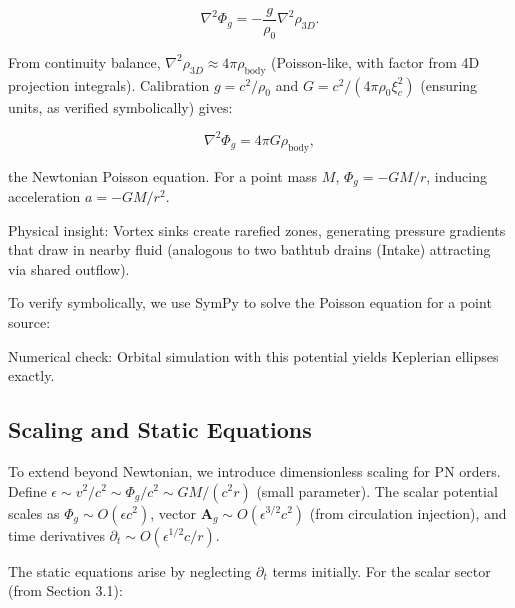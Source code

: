 \[
\nabla^2 \Phi_g = -\frac{g}{\rho_0} \nabla^2 \rho_{3D}.
\]

From continuity balance, $\nabla^2 \rho_{3D} \approx 4\pi \rho_{\text{body}}$ (Poisson-like, with factor from 4D projection integrals). Calibration $g = c^2 / \rho_0$ and $G = c^2 / (4\pi \rho_0 \xi_c^2)$ (ensuring units, as verified symbolically) gives:

\[
\nabla^2 \Phi_g = 4\pi G \rho_{\text{body}},
\]

the Newtonian Poisson equation. For a point mass $M$, $\Phi_g = -G M / r$, inducing acceleration $a = -G M / r^2$.

Physical insight: Vortex sinks create rarefied zones, generating pressure gradients that draw in nearby fluid (analogous to two bathtub drains (Intake) attracting via shared outflow).

To verify symbolically, we use SymPy to solve the Poisson equation for a point source:


Numerical check: Orbital simulation with this potential yields Keplerian ellipses exactly.

\medskip
\noindent
{}
\medskip

\subsection{Scaling and Static Equations}

To extend beyond Newtonian, we introduce dimensionless scaling for PN orders. Define $\epsilon \sim v^2 / c^2 \sim \Phi_g / c^2 \sim G M / (c^2 r)$ (small parameter). The scalar potential scales as $\Phi_g \sim O(\epsilon c^2)$, vector $\mathbf{A}_g \sim O(\epsilon^{3/2} c^2)$ (from circulation injection), and time derivatives $\partial_t \sim O(\epsilon^{1/2} c / r)$.

The static equations arise by neglecting $\partial_t$ terms initially. For the scalar sector (from Section 3.1):

